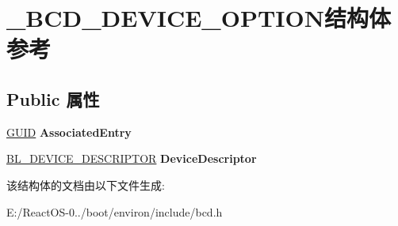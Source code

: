 \hypertarget{struct___b_c_d___d_e_v_i_c_e___o_p_t_i_o_n}{}\section{\+\_\+\+B\+C\+D\+\_\+\+D\+E\+V\+I\+C\+E\+\_\+\+O\+P\+T\+I\+O\+N结构体 参考}
\label{struct___b_c_d___d_e_v_i_c_e___o_p_t_i_o_n}
\subsection*{Public 属性}
\begin{DoxyCompactItemize}
\item 
\mbox{\label{struct___b_c_d___d_e_v_i_c_e___o_p_t_i_o_n_a7e4cacf4ed220b4e794467becadcb3b4}} 
\hyperlink{interface_g_u_i_d}{G\+U\+ID} {\bfseries Associated\+Entry}
\item 
\mbox{\label{struct___b_c_d___d_e_v_i_c_e___o_p_t_i_o_n_a2fb25ddbe88ac51fdab2517cddc3c4af}} 
\hyperlink{struct___b_l___d_e_v_i_c_e___d_e_s_c_r_i_p_t_o_r}{B\+L\+\_\+\+D\+E\+V\+I\+C\+E\+\_\+\+D\+E\+S\+C\+R\+I\+P\+T\+OR} {\bfseries Device\+Descriptor}
\end{DoxyCompactItemize}


该结构体的文档由以下文件生成\+:\begin{DoxyCompactItemize}
\item 
E\+:/\+React\+O\+S-\/0../boot/environ/include/bcd.\+h\end{DoxyCompactItemize}
